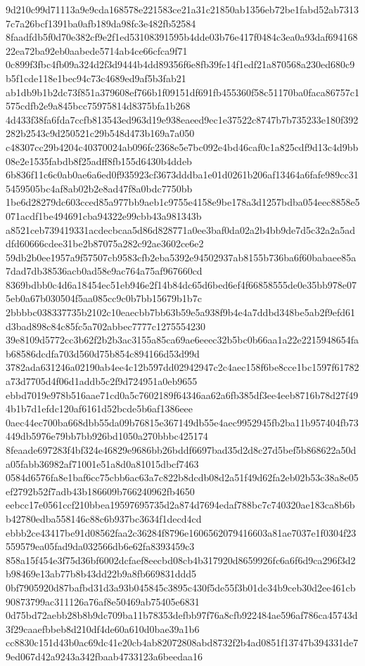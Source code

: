 \documentclass[11pt,a4paper]{article}
\begin{document}
{9d210c99d71113a9e9cda168578e221583ce21a31c21850ab1356eb72be1fabd52ab73137c7a26bcf1391ba0afb189da98fc3e482fb52584
8faadfdb5f0d70e382cf9e2f1ed53108391595b4dde03b76e417f0484c3ea0a93daf69416822ea72ba92eb0aabede5714ab4ce66cfca9f71
0c899f3fbc4fb09a324d2f3d9444b4dd89356f6e8fb39fe14f1edf21a870568a230ed680c9b5f1cde118e1bec94c73c4689ed9af5b3fab21
ab1db9b1b2dc73f851a379608ef766b1f09151df691fb455360f58c51170ba0faca86757c1575cdfb2e9a845bcc75975814d8375bfa1b268
4d433f38fa6fda7ccfb813543ed963d19e938eaeed9ec1e37522c8747b7b735233e180f392282b2543c9d250521c29b548d473b169a7a050
c48307cc29b4204c40370024ab096fc2368e5e7bc092e4bd46caf0c1a825cdf9d13c4d9bb08e2e1535fabdb8f25adff8fb155d6430b4ddeb
6b836f11c6c0ab0ae6a6ed0f935923cf3673dddba1e01d0261b206af13464a6fafe989cc315459505bc4af8ab02b2e8ad47f8a0bdc7750bb
1be6d28279dc603cced85a977bb9aeb1c9755e4158e9be178a3d1257bdba054eec8858e5071acdf1be494691cba94322e99cbb43a981343b
a8521ceb739419331acdecbcaa5d86d828771a0ee3baf0da02a2b4bb9de7d5c32a2a5addfd60666cdee31be2b87075a282c92ae3602ce6e2
59db2b0ee1957a9f57507cb9583cfb2eba5392e94502937ab8155b736ba6f60babaee85a7dad7db38536acb0ad58e9ac764a75af967660cd
8369bdbb0c4d6a18454ec51eb946e2f14b84dc65d6bed6ef4f66858555de0e35bb978e075eb0a67b030504f5aa085cc9c0b7bb15679b1b7c
2bbbbc038337735b2102c10eaecbb7bb63b59e5a938f9b4e4a7ddbd348be5ab2f9efd61d3bad898c84c85fc5a702abbec7777c1275554230
39e8109d5772cc3b62f2b2b3ac3155a85ca69ae6eeec32b5bc0b66aa1a22e2215948654fab68586dcdfa703d560d75b854c894166d53d99d
3782ada631246a02190ab4ee4c12b597dd02942947c2c4aec158f6be8cce1bc1597f61782a73d7705d4f06d1addb5c2f9d724951a0eb9655
ebbd7019e978b516aae71cd0a5c7602189f64346aa62a6fb385df3ee4eeb8716b78d27f494b1b7d1efdc120af6161d52bcde5b6af1386eee
0aec44ec700ba668dbb55da09b76815e367149db55e4aec9952945fb2ba11b957404fb73449db5976e79bb7bb926bd1050a270bbbc425174
8feaade697283f4bf324e46829e9686bb26bddf6697bad35d2d8c27d5bef5b868622a50da05fabb36982af71001e51a8d0a81015dbcf7463
0584d6576fa8e1baf6cc75cbb6ac63a7c822b8dcdb08d2a51f49d62fa2eb02b53c38a8e05ef2792b52f7adb43b186609b766240962fb4650
eebcc17e0561ccf210bbea19597695735d2a874d7694edaf788bc7c740320ae183ca8b6bb42780edba558146c88c6b937bc3634f1decd4cd
ebbb2ce43417be91d08562faa2c36284f8796e1606562079416603a81ae7037e1f0304f23559579ea05fad9da032566db6e62fa8393459c3
858a15f454e3f75d36bf6002dcfaef8eecbd08cb4b317920d8659926fc6a6f6d9ca296f3d2b98469e13ab77b8b43dd22b9a8fb669831ddd5
0bf7905920d87bafbd31d3a93b045845c3895c430f5de55f3b01de34b9ceb30d2ee461cb90873799ac311126a76af8e50469ab75405e6831
0d75bd72aebb28b8b9dc709ba11b78353defbb97f76a8cfb922484ae596af786ca45743d3f29caaefbbeb8d210df4de60a610d0bae39a1b6
cc8830c151d43b0ac69dc41e20cb4ab82072808abd8732f2b4ad0851f13747b394331de79ed067d42a9243a342fbaab4733123a6beedaa16
}
\end{document}
